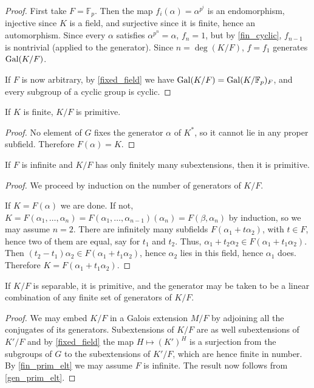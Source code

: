 \begin{proof} First take $F = \mathbb{F}_p$.  Then the map $f_i(\alpha) =
\alpha^{p^i}$ is an endomorphism, injective since $K$ is a field, and
surjective since it is finite, hence an automorphism.  Since every $\alpha$
satisfies $\alpha^{p^n} = \alpha$, $f_n = 1$, but by \ref{fin_cyclic}, $f_{n -
1}$ is nontrivial (applied to the generator).  Since $n = \deg(K/F)$, $f =
f_1$ generates $\operatorname{\text{Gal}}(K/F)$.

If $F$ is now arbitrary, by \ref{fixed_field} we have $\operatorname{\text{Gal}}(K/F) =
\operatorname{\text{Gal}}(K/\mathbb{F}_p)_F$, and every subgroup of a cyclic group is cyclic.
\end{proof}

\begin{corollary} If $K$ is finite, $K/F$ is primitive.
\label{fin_prim_elt}
\end{corollary}

\begin{proof} No element of $G$ fixes the generator $\alpha$ of $K^\ast$, so
it cannot lie in any proper subfield.  Therefore $F(\alpha) = K$. \end{proof}

\begin{proposition} If $F$ is infinite and $K/F$ has only finitely many subextensions, then it is
primitive.
\label{gen_prim_elt}
\end{proposition}

\begin{proof} We proceed by induction on the number of generators of $K/F$.

If $K = F(\alpha)$ we are done.  If not, $K = F(\alpha_1, \dots, \alpha_n) =
F(\alpha_1, \dots, \alpha_{n - 1})(\alpha_n) = F(\beta, \alpha_n)$ by
induction, so we may assume $n = 2$.  There are infinitely many subfields
$F(\alpha_1 + t \alpha_2)$, with $t \in F$, hence two of them are equal, say for $t_1$ and
$t_2$.  Thus, $\alpha_1 + t_2 \alpha_2 \in F(\alpha_1 + t_1 \alpha_2)$.  Then
$(t_2 - t_1)\alpha_2 \in F(\alpha_1 + t_1 \alpha_2)$, hence $\alpha_2$ lies in
this field, hence $\alpha_1$ does.  Therefore $K = F(\alpha_1 + t_1
\alpha_2)$. \end{proof}

\begin{corollary} If $K/F$ is separable, it is primitive, and the generator may be
taken to be a linear combination of any finite set of generators of $K/F$.
\label{prim_elt}
\end{corollary}

\begin{proof} We may embed $K/F$ in a Galois extension $M/F$ by adjoining all
the conjugates of its generators.  Subextensions of $K/F$ are as well subextensions
of $K'/F$ and by \ref{fixed_field} the map $H \mapsto (K')^H$ is a surjection
from the subgroups of $G$ to the subextensions of $K'/F$, which are hence
finite in number.  By \ref{fin_prim_elt} we may assume $F$ is infinite.  The
result now follows from \ref{gen_prim_elt}. \end{proof}


